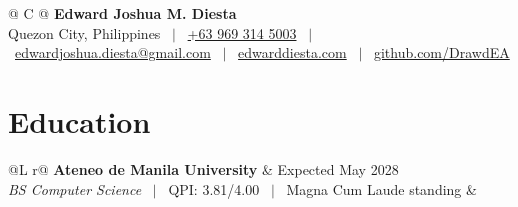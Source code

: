 \documentclass[a4paper,9pt]{article}
\begin{document}
\begin{tabularx}{\linewidth}{@{} C @{}}
\huge{\textbf{Edward Joshua M. Diesta}} \\[3pt]
Quezon City, Philippines \ $|$ \
\href{tel:+639693145003}{+63 969 314 5003} \ $|$ \
\href{mailto:edwardjoshua.diesta@gmail.com}{edwardjoshua.diesta@gmail.com} \ $|$ \
\href{https://edwarddiesta.com}{edwarddiesta.com} \ $|$ \
\href{https://github.com/DrawdEA}{github.com/DrawdEA}
\end{tabularx}

\section{Education}
\begin{tabularx}{\linewidth}{@{}L r@{}}
\textbf{Ateneo de Manila University} & Expected May 2028 \\
\textit{BS Computer Science} \ $|$ \ QPI: 3.81/4.00 \ $|$ \ Magna Cum Laude standing & \\
 \\
\end{tabularx}
\end{document}
